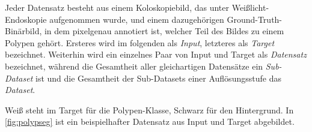 Jeder Datensatz besteht aus einem Koloskopiebild, das unter Weißlicht-Endoskopie aufgenommen wurde, und einem dazugehörigen Ground-Truth-Binärbild, in dem pixelgenau annotiert ist, welcher Teil des Bildes zu einem Polypen gehört.
Ersteres wird im folgenden als \emph{Input}, letzteres als \emph{Target} bezeichnet.
Weiterhin wird ein einzelnes Paar von Input und Target als \emph{Datensatz} bezeichnet, während die Gesamtheit aller gleichartigen Datensätze ein \emph{Sub-Dataset} ist und die Gesamtheit der Sub-Datasets einer Auflösungsstufe das \emph{Dataset}.

Weiß steht im Target für die Polypen-Klasse, Schwarz für den Hintergrund.
In \autoref{fig:polypseg} ist ein beispielhafter Datensatz aus Input und Target abgebildet.

